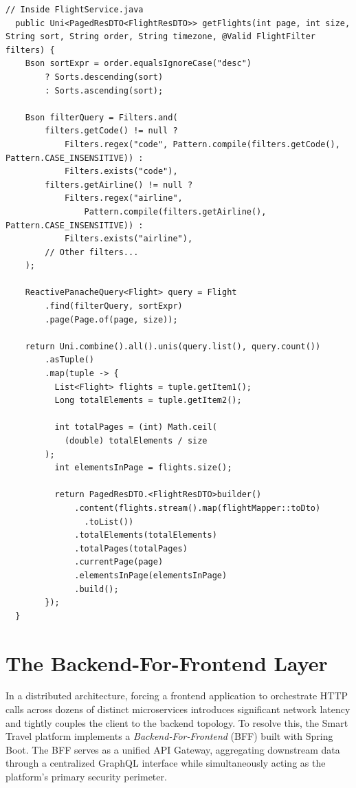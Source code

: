 \begin{lstlisting}[language=JavaExtended, caption={Quarkus Panache Reactive Query with Dynamic Filters}, label={lst:quarkus_dynamic_query}]
  // Inside FlightService.java
  public Uni<PagedResDTO<FlightResDTO>> getFlights(int page, int size, String sort, String order, String timezone, @Valid FlightFilter filters) {
    Bson sortExpr = order.equalsIgnoreCase("desc")
        ? Sorts.descending(sort)
        : Sorts.ascending(sort);

    Bson filterQuery = Filters.and(
        filters.getCode() != null ?
            Filters.regex("code", Pattern.compile(filters.getCode(), Pattern.CASE_INSENSITIVE)) :
            Filters.exists("code"),
        filters.getAirline() != null ?
            Filters.regex("airline",
                Pattern.compile(filters.getAirline(), Pattern.CASE_INSENSITIVE)) :
            Filters.exists("airline"),
        // Other filters...
    );

    ReactivePanacheQuery<Flight> query = Flight
        .find(filterQuery, sortExpr)
        .page(Page.of(page, size));

    return Uni.combine().all().unis(query.list(), query.count())
        .asTuple()
        .map(tuple -> {
          List<Flight> flights = tuple.getItem1();
          Long totalElements = tuple.getItem2();

          int totalPages = (int) Math.ceil(
            (double) totalElements / size
        );
          int elementsInPage = flights.size();

          return PagedResDTO.<FlightResDTO>builder()
              .content(flights.stream().map(flightMapper::toDto)
                .toList())
              .totalElements(totalElements)
              .totalPages(totalPages)
              .currentPage(page)
              .elementsInPage(elementsInPage)
              .build();
        });
  }
\end{lstlisting}


\section{The Backend-For-Frontend Layer}
\label{sec:bff_implementation}

In a distributed architecture, forcing a frontend application to orchestrate HTTP calls across dozens of distinct microservices introduces significant network latency and tightly couples the client to the backend topology. To resolve this, the Smart Travel platform implements a \textit{Backend-For-Frontend} (\gls{BFF}) built with Spring Boot. The BFF serves as a unified API Gateway, aggregating downstream data through a centralized GraphQL interface while simultaneously acting as the platform's primary security perimeter.

